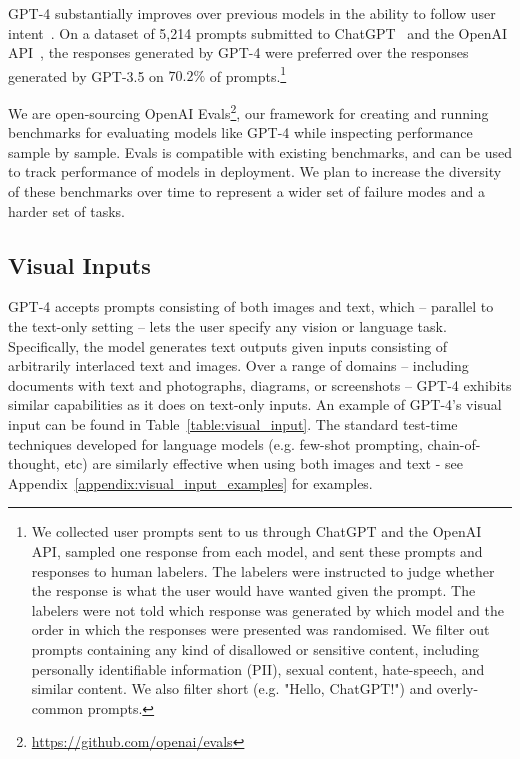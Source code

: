 \documentclass{article}
\begin{document}
GPT-4 substantially improves over previous models in the ability to follow user intent~\cite{ouyang2022training}. On a dataset of 5,214 prompts submitted to ChatGPT~\cite{openaichatgptblog} and the OpenAI API~\cite{openaiapiblog}, the responses generated by GPT-4 were preferred over the responses generated by GPT-3.5 on $70.2\%$ of prompts.\footnote{We collected user prompts sent to us through ChatGPT and the OpenAI API, sampled one response from each model, and sent these prompts and responses to human labelers. The labelers were instructed to judge whether the response is what the user would have wanted given the prompt. The labelers were not told which response was generated by which model and the order in which the responses were presented was randomised. We filter out prompts containing any kind of disallowed or sensitive content, including personally identifiable information (PII), sexual content, hate-speech, and similar content. We also filter short (e.g. "Hello, ChatGPT!") and overly-common prompts.}

We are open-sourcing OpenAI Evals\footnote{\href{https://github.com/openai/evals}{https://github.com/openai/evals}}, our framework for creating and running benchmarks for evaluating models like GPT-4 while inspecting performance sample by sample. Evals is compatible with existing benchmarks, and can be used to track performance of models in deployment. We plan to increase the diversity of these benchmarks over time to represent a wider set of failure modes and a harder set of tasks.

\subsection{Visual Inputs}

GPT-4 accepts prompts consisting of both images and text, which -- parallel to the text-only setting -- lets the user specify any vision or language task.
Specifically, the model generates text outputs given inputs consisting of arbitrarily
interlaced text and images.
Over a range of domains -- including documents with text and photographs, diagrams, or screenshots -- GPT-4 exhibits similar capabilities as it does on text-only inputs. An example of GPT-4's visual input can be found in Table~\ref{table:visual_input}. The standard test-time techniques developed for language models (e.g. few-shot prompting, chain-of-thought, etc) are similarly effective when using both images and text - see Appendix~\ref{appendix:visual_input_examples} for examples.
\end{document}
